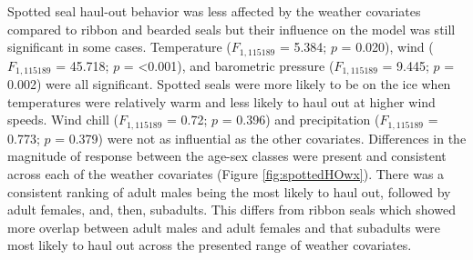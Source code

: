 \documentclass[fleqn,10pt,lineno]{wlpeerj} %
\begin{document}
Spotted seal haul-out behavior was less affected by the weather covariates
compared to ribbon and bearded seals but their influence on the model was still
significant in some cases.
Temperature
(\(F_{1,115189}\)
= 5.384; \(p\) = 0.020), wind
(\(F_{1,115189}\)
= 45.718; \(p\) = \textless0.001),
and barometric pressure
(\(F_{1,115189}\)
= 9.445; \(p\) =
0.002) were all significant. Spotted seals were more likely to be on the ice when
temperatures were relatively warm and less likely to
haul out at higher wind speeds. Wind chill
(\(F_{1,115189}\)
= 0.72; \(p\) =
0.396) and
precipitation
(\(F_{1,115189}\)
= 0.773; \(p\) =
0.379)
were not as influential as the other covariates.
Differences in the magnitude of response between the age-sex classes were
present and consistent across each of the weather covariates (Figure
\ref{fig:spottedHOwx}). There was a consistent ranking of adult males being the most
likely to haul out, followed by adult females, and, then, subadults. This differs
from ribbon seals which showed more overlap between adult males and adult females
and that subadults were most likely to haul out across the presented range of weather
covariates.
\end{document}
